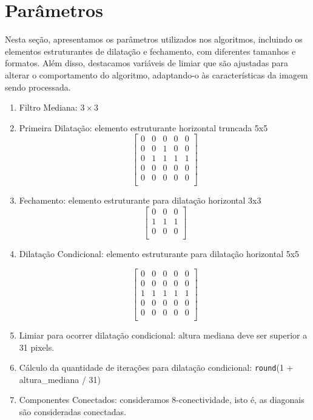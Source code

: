 \documentclass[english, 
               brazil, 
               bsc] %
               {dcomp-abntex2}
\begin{document}
\section{Parâmetros} \label{sec-parametros}
Nesta seção, apresentamos os parâmetros utilizados nos algoritmos, incluindo os elementos estruturantes de dilatação e fechamento, com diferentes tamanhos e formatos. Além disso, destacamos variáveis de limiar que são ajustadas para alterar o comportamento do algoritmo, adaptando-o às características da imagem sendo processada.


\begin{enumerate}
  \item Filtro Mediana: $3 \times 3$
  \item Primeira Dilatação: elemento estruturante horizontal truncada 5x5
\[
\begin{bmatrix}
0 & 0 & 0 & 0 & 0 \\
0 & 0 & 1 & 0 & 0 \\
0 & 1 & 1 & 1 & 1 \\
0 & 0 & 0 & 0 & 0 \\
0 & 0 & 0 & 0 & 0 \\
\end{bmatrix}
\]
  \item Fechamento: elemento estruturante para dilatação horizontal 3x3
\[
\begin{bmatrix}
0 & 0 & 0 \\
1 & 1 & 1 \\
0 & 0 & 0 \\
\end{bmatrix}
\]


  \item Dilatação Condicional: elemento estruturante para dilatação horizontal 5x5


\[
\begin{bmatrix}
0 & 0 & 0 & 0 & 0 \\
0 & 0 & 0 & 0 & 0 \\
1 & 1 & 1 & 1 & 1 \\
0 & 0 & 0 & 0 & 0 \\
0 & 0 & 0 & 0 & 0 \\
\end{bmatrix}
\]
       
\item Limiar para ocorrer dilatação condicional: altura mediana deve ser superior a 31 pixels.


\item Cálculo da quantidade de iterações para dilatação condicional: \texttt{round}(1 + altura\_mediana / 31)


\item Componentes Conectados: consideramos 8-conectividade, isto é, as diagonais são consideradas conectadas.


\end{enumerate}
\end{document}
